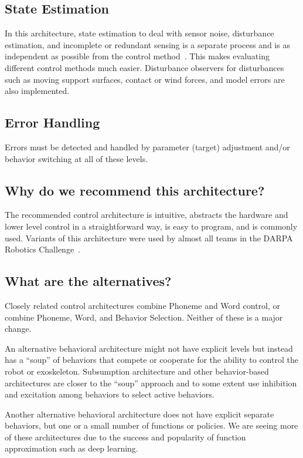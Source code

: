 \documentclass[letterpaper,12pt,fullpage]{article}
\begin{document}
\subsection{State Estimation}

In this architecture, state estimation to deal with sensor noise,
disturbance estimation, and incomplete or
redundant sensing is a separate process and is as independent as possible
from the control method~\cite{certainty-eq,separation-prin}.
This makes evaluating different control methods much easier.
Disturbance observers for disturbances such as
moving support surfaces, contact or wind forces, and model errors
are also implemented.

\subsection{Error Handling}

Errors must be detected and handled by parameter (target)
adjustment and/or behavior switching
at all of these levels.

\subsection{Why do we recommend this architecture?}

The recommended control architecture is intuitive, abstracts the hardware 
and lower level control in a straightforward way, is easy to program, and is
commonly used. Variants of this architecture were used by almost all teams
in the DARPA Robotics Challenge~\cite{}.

\subsection{What are the alternatives?}

Closely related control architectures combine Phoneme and Word control,
or combine Phoneme, Word, and Behavior Selection.
Neither of these is a major change.

An alternative behavioral architecture might not have explicit levels but instead
has a ``soup'' of behaviors that compete or cooperate for the ability to
control the robot or exoskeleton. Subsumption architecture and other behavior-based
architectures are closer to the ``soup'' approach and to some extent
use inhibition and excitation
among behaviors to select active behaviors.

Another alternative behavioral architecture does not have explicit separate behaviors,
but one or a small number of functions or policies. 
We are seeing more of these architectures
due to the success and popularity of function approximation such as
deep learning.
\end{document}
